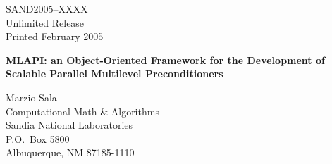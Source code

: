 \documentclass{article}[11pt]
\newcommand{\MLAPIns}  {{\sc MLAPI}}
\def\draft{%
\special{!userdict begin /bop-hook{gsave
200 30 translate 65 rotate
/Times-Roman findfont 216 scalefont setfont
0 0 moveto 0.9 setgray (DRAFT) show grestore}def end}
}
\begin{document}

\setcounter{page}{3}

\large


%
%
\begin{center}
SAND2005--XXXX \\
Unlimited Release \\
Printed February 2005
\end{center}

\vspace{0.2in}

\begin{center}
{\Large {\bf \MLAPIns: an Object-Oriented Framework 
  for the Development of Scalable Parallel Multilevel Preconditioners}}

\vspace*{0.8in}
Marzio  Sala \\
Computational Math \& Algorithms \\
Sandia National Laboratories\\
P.O.~Box 5800 \\
Albuquerque, NM 87185-1110
\vspace*{1in}

\end{center}
\end{document}
